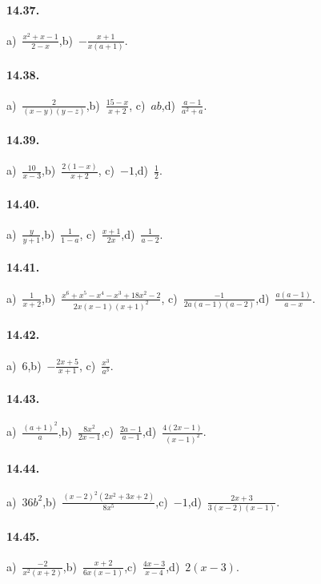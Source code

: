 \paragraph{14.37.}
a)~$\frac{x^{2}+x-1}{2-x}$,\quad b)~$-\frac{x+1}{x(a+1)}$.

\paragraph{14.38.}
a)~$\frac{2}{(x-y)(y-z)}$,\quad b)~$\frac{15-x}{x+2}$, \quad c)~$ab$,\quad d)~$\frac{a-1}{a^{2}+a}$.

\paragraph{14.39.}
a)~$\frac{10}{x-3}$,\quad b)~$\frac{2(1-x)}{x+2}$, \quad c)~$-1$,\quad d)~$\frac{1}{2}$.

\paragraph{14.40.}
a)~$\frac{y}{y+1}$,\quad b)~$\frac{1}{1-a}$, \quad c)~$\frac{x+1}{2x}$,\quad d)~$\frac{1}{a-2}$.

\paragraph{14.41.}
a)~$\frac{1}{x+2}$,\quad b)~$\frac{x^{6}+x^{5}-x^{4}-x^{3}+18x^{2}-2}{2x(x-1)(x+1)^{2}}$, \quad c)~$\frac{-1}{2a(a-1)(a-2)}$,\quad d)~$\frac{a(a-1)}{a-x}$.

\paragraph{14.42.}
a)~$6$,\quad b)~$-\frac{2x+5}{x+1}$, \quad c)~$\frac{x^{3}}{a^{3}}$.

\paragraph{14.43.}
a)~$\frac{(a+1)^{2}}{a}$,\quad b)~$\frac{8x^{2}}{2x-1}$,\quad c)~$\frac{2a-1}{a-1}$,\quad d)~$\frac{4(2x-1)}{(x-1)^{2}}$.

\paragraph{14.44.}
a)~$36b^{2}$,\quad b)~$\frac{(x-2)^{2}(2x^{2}+3x+2)}{8x^{5}}$,\quad c)~$-1$,\quad d)~$\frac{2x+3}{3(x-2)(x-1)}$.

\paragraph{14.45.}
a)~$\frac{-2}{x^{2}(x+2)}$,\quad b)~$\frac{x+2}{6x(x-1)}$,\quad c)~$\frac{4x-3}{x-4}$,\quad d)~$2(x-3)$.

